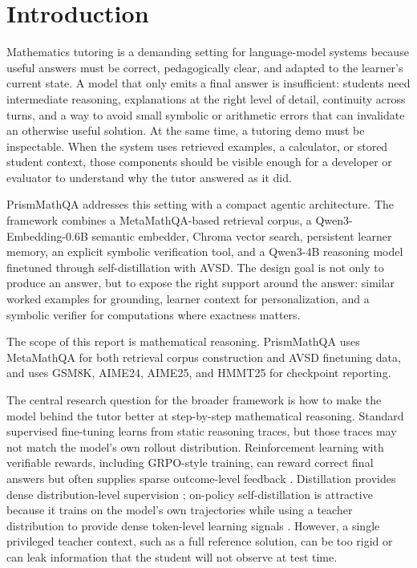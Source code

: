 \section{Introduction}

Mathematics tutoring is a demanding setting for language-model systems because useful answers must be correct, pedagogically clear, and adapted to the learner's current state. A model that only emits a final answer is insufficient: students need intermediate reasoning, explanations at the right level of detail, continuity across turns, and a way to avoid small symbolic or arithmetic errors that can invalidate an otherwise useful solution. At the same time, a tutoring demo must be inspectable. When the system uses retrieved examples, a calculator, or stored student context, those components should be visible enough for a developer or evaluator to understand why the tutor answered as it did.

PrismMathQA addresses this setting with a compact agentic architecture. The framework combines a MetaMathQA-based retrieval corpus, a Qwen3-Embedding-0.6B semantic embedder, Chroma vector search, persistent learner memory, an explicit symbolic verification tool, and a Qwen3-4B reasoning model finetuned through self-distillation with AVSD. The design goal is not only to produce an answer, but to expose the right support around the answer: similar worked examples for grounding, learner context for personalization, and a symbolic verifier for computations where exactness matters.

The scope of this report is mathematical reasoning. PrismMathQA uses MetaMathQA for both retrieval corpus construction and AVSD finetuning data, and uses GSM8K, AIME24, AIME25, and HMMT25 for checkpoint reporting.

The central research question for the broader framework is how to make the model behind the tutor better at step-by-step mathematical reasoning. Standard supervised fine-tuning learns from static reasoning traces, but those traces may not match the model's own rollout distribution. Reinforcement learning with verifiable rewards, including GRPO-style training, can reward correct final answers but often supplies sparse outcome-level feedback \citep{shao2024deepseekmath,deepseek2025r1}. Distillation provides dense distribution-level supervision \citep{hinton2015distilling}; on-policy self-distillation is attractive because it trains on the model's own trajectories while using a teacher distribution to provide dense token-level learning signals \citep{agarwal2024onpolicy,zhao2026selfdistilled}. However, a single privileged teacher context, such as a full reference solution, can be too rigid or can leak information that the student will not observe at test time.

